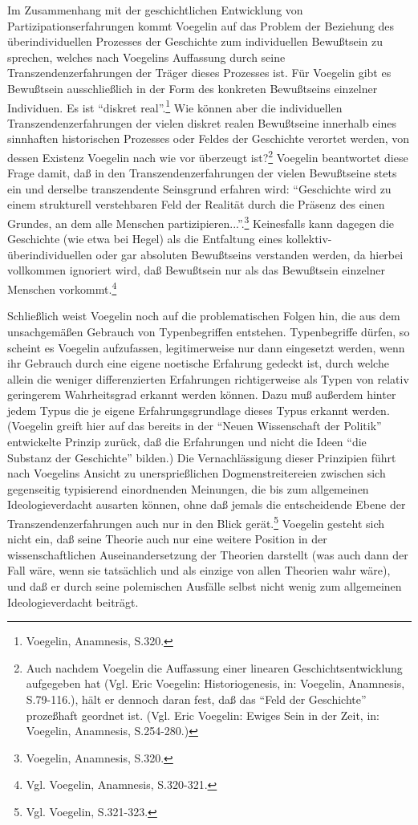 Im Zusammenhang mit der geschichtlichen Entwicklung von
Partizipationserfahrungen kommt Voegelin auf das Problem der Beziehung
des überindividuellen Prozesses der Geschichte zum individuellen
Bewußtsein zu sprechen, welches nach Voegelins Auffassung durch seine
Transzendenzerfahrungen der Träger dieses Prozesses ist. Für Voegelin
gibt es Bewußtsein ausschließlich in der Form des konkreten Bewußtseins
einzelner Individuen. Es ist "`diskret real"'.\footnote{Voegelin,
  Anamnesis, S.320.}  Wie können aber die individuellen
Transzendenzerfahrungen der vielen diskret realen Bewußtseine innerhalb
eines sinnhaften historischen Prozesses oder Feldes der Geschichte
verortet werden, von dessen Existenz Voegelin nach wie vor überzeugt
ist?\footnote{Auch nachdem Voegelin die Auffassung einer linearen
  Geschichtsentwicklung aufgegeben hat (Vgl. Eric Voegelin:
  Historiogenesis, in: Voegelin, Anamnesis, S.79-116.), hält er dennoch
  daran fest, daß das "`Feld der Geschichte"' prozeßhaft geordnet ist.
  (Vgl. Eric Voegelin: Ewiges Sein in der Zeit, in: Voegelin, Anamnesis,
  S.254-280.)}  Voegelin beantwortet diese Frage damit, daß in den
Transzendenzerfahrungen der vielen Bewußtseine stets ein und derselbe
transzendente Seinsgrund erfahren wird: "`Geschichte wird zu einem
strukturell verstehbaren Feld der Realität durch die Präsenz des einen
Grundes, an dem alle Menschen partizipieren..."'.\footnote{Voegelin,
  Anamnesis, S.320.} Keinesfalls kann dagegen die Geschichte (wie etwa
bei Hegel) als die Entfaltung eines kollektiv-überindividuellen oder gar
absoluten Bewußtseins verstanden werden, da hierbei vollkommen ignoriert
wird, daß Bewußtsein nur als das Bewußtsein einzelner Menschen
vorkommt.\footnote{Vgl.  Voegelin, Anamnesis, S.320-321.}

Schließlich weist Voegelin noch auf die problematischen Folgen hin, die
aus dem unsachgemäßen Gebrauch von Typenbegriffen entstehen.
Typenbegriffe dürfen, so scheint es Voegelin aufzufassen, legitimerweise
nur dann eingesetzt werden, wenn ihr Gebrauch durch eine eigene
noetische Erfahrung gedeckt ist, durch welche allein die weniger
differenzierten Erfahrungen richtigerweise als Typen von relativ
geringerem Wahrheitsgrad erkannt werden können. Dazu muß außerdem hinter
jedem Typus die je eigene Erfahrungsgrundlage dieses Typus erkannt
werden. (Voegelin greift hier auf das bereits in der "`Neuen
Wissenschaft der Politik"' entwickelte Prinzip zurück, daß die
Erfahrungen und nicht die Ideen "`die Substanz der Geschichte"' bilden.)
Die Vernachlässigung dieser Prinzipien führt nach Voegelins Ansicht zu
unersprießlichen Dogmenstreitereien zwischen sich gegenseitig
typisierend einordnenden Meinungen, die bis zum allgemeinen
Ideologieverdacht ausarten können, ohne daß jemals die entscheidende
Ebene der Transzendenzerfahrungen auch nur in den Blick
gerät.\footnote{Vgl. Voegelin, S.321-323.} Voegelin gesteht sich nicht
ein, daß seine Theorie auch nur eine weitere Position in der
wissenschaftlichen Auseinandersetzung der Theorien darstellt (was auch
dann der Fall wäre, wenn sie tatsächlich und als einzige von allen
Theorien wahr wäre), und daß er durch seine polemischen Ausfälle selbst
nicht wenig zum allgemeinen Ideologieverdacht beiträgt.

